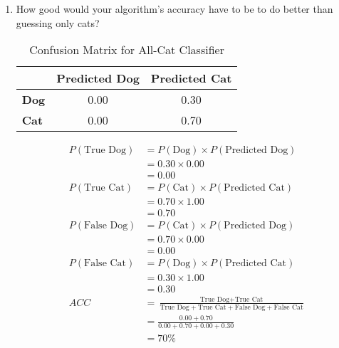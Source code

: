 \documentclass[12pt]{article}
\begin{document}
\begin{enumerate}
\begin{enumerate}
  \newpage

  \item How good would your algorithm's accuracy have to be to do better than guessing only cats?
  \vspace{-1em}
    \begin{table}[h!]
      \begin{center}
          \caption{Confusion Matrix for All-Cat Classifier}
          \label{tab:table2}
          \begin{tabular}{l|c|c}
            & \textbf{Predicted Dog} & \textbf{Predicted Cat} \\
            \hline
            \textbf{Dog} & 0.00 & 0.30 \\
            \textbf{Cat} & 0.00 & 0.70 \\
          \end{tabular}
      \end{center}
    \end{table}

    \vspace{-3em}

    \begin{align*}
      P(\text{True Dog}) &= P(\text{Dog}) \times P(\text{Predicted Dog})\\
        &= 0.30 \times 0.00\\
        &= 0.00\\
        P(\text{True Cat}) &= P(\text{Cat}) \times P(\text{Predicted Cat})\\
        &= 0.70 \times 1.00\\
        &= 0.70\\
      P(\text{False Dog}) &= P(\text{Cat}) \times P(\text{Predicted Dog})\\
        &= 0.70 \times 0.00\\
        &= 0.00\\
        P(\text{False Cat}) &= P(\text{Dog}) \times P(\text{Predicted Cat})\\
        &= 0.30 \times 1.00\\
        &= 0.30\\
        ACC &= \frac{\text{True Dog} + \text{True Cat}}{\text{True Dog} + \text{True Cat} + \text{False Dog} + \text{False Cat}}\\[8pt]
        &= \frac{0.00 + 0.70}{0.00 + 0.70 + 0.00 + 0.30}\\[8pt]
        &= \boxed{70\%}
  \end{align*}

  \newpage


\end{enumerate}
\end{enumerate}
\end{document}
